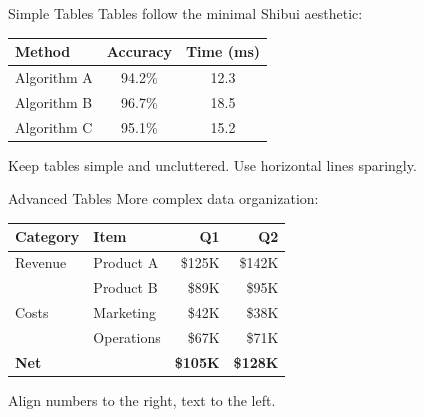 \documentclass[aspectratio=169]{beamer}
\begin{document}
\begin{frame}{Simple Tables}
  Tables follow the minimal Shibui aesthetic:

  \vspace{1em}

  \centering
  \begin{tabular}{lcc}
    \hline
    \textbf{Method} & \textbf{Accuracy} & \textbf{Time (ms)} \\
    \hline
    Algorithm A & 94.2\% & 12.3 \\
    Algorithm B & 96.7\% & 18.5 \\
    Algorithm C & 95.1\% & 15.2 \\
    \hline
  \end{tabular}

  \vspace{1em}

  \small Keep tables simple and uncluttered. Use horizontal lines sparingly.
\end{frame}

\begin{frame}{Advanced Tables}
  More complex data organization:

  \vspace{0.5em}

  \centering
  \begin{tabular}{llrr}
    \hline
    \textbf{Category} & \textbf{Item} & \textbf{Q1} & \textbf{Q2} \\
    \hline
    Revenue & Product A & \$125K & \$142K \\
            & Product B & \$89K  & \$95K \\
    \hline
    Costs   & Marketing & \$42K  & \$38K \\
            & Operations & \$67K & \$71K \\
    \hline
    \textbf{Net} & & \textbf{\$105K} & \textbf{\$128K} \\
    \hline
  \end{tabular}

  \vspace{1em}

  \small Align numbers to the right, text to the left.
\end{frame}
\end{document}
